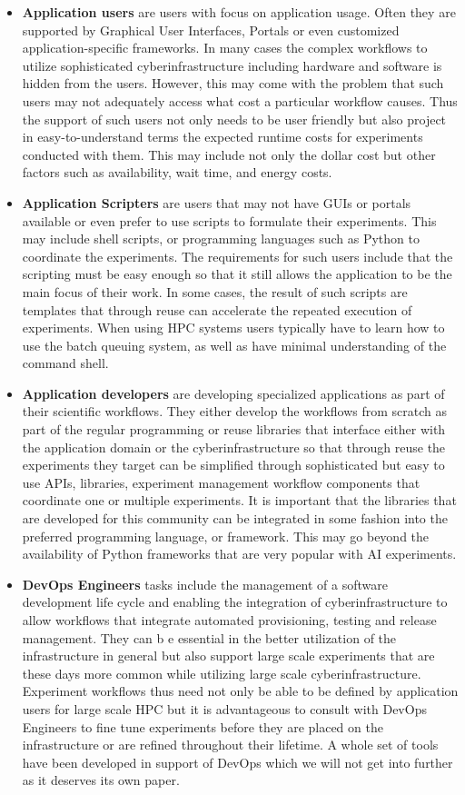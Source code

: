 \documentclass[utf8]{FrontiersinVancouver} %
\begin{document}
\begin{itemize}
    \item {\bf Application users} are users with focus on application usage. Often they are supported by Graphical User Interfaces, Portals or even customized application-specific frameworks. In many cases the complex workflows to utilize sophisticated cyberinfrastructure including hardware and software is hidden from the users. However, this may come with the problem that such users may not adequately access what cost a particular workflow causes. Thus the support of such users not only needs to be user friendly but also project in easy-to-understand terms the expected runtime costs for experiments conducted with them. This may include not only the dollar cost but other factors such as availability, wait time, and energy costs.
    \item {\bf Application Scripters} are users that may not have GUIs or portals available or even prefer to use scripts to formulate their experiments. This may include shell scripts, or programming languages such as Python to coordinate the experiments. The requirements for such users include that the scripting must be easy enough so that it still allows the application to be the main focus of their work. In some cases, the result of such scripts are templates that through reuse can accelerate the repeated execution of experiments. When using HPC systems users typically have to learn how to use the batch queuing system, as well as have minimal understanding of the command shell. 
    \item {\bf Application developers} are developing specialized applications as part of their scientific workflows. They either develop the workflows from scratch as part of the regular programming or reuse libraries that interface either with the application domain or the cyberinfrastructure so that through reuse the experiments they target can be simplified through sophisticated but easy to use APIs, libraries, experiment management workflow components that coordinate one or multiple experiments. It is important that the libraries that are developed for this community can be integrated in some fashion into the preferred programming language, or framework. This may go beyond the availability of Python frameworks that are very popular with AI experiments. 
    \item {\bf DevOps Engineers} tasks include the management of a software development life cycle and enabling the integration of cyberinfrastructure to allow workflows that integrate automated provisioning, testing and release management. They can b e essential in the better utilization of the infrastructure in general but also support large scale experiments that are these days more common while utilizing large scale cyberinfrastructure. Experiment workflows thus need not only be able to be defined by application users for large scale HPC but it is advantageous to consult with DevOps Engineers to fine tune experiments before they are placed on the infrastructure or are refined throughout their lifetime. A whole set of tools have been developed in support of DevOps which we will not get into further as it deserves its own paper.

\end{itemize}
\end{document}
